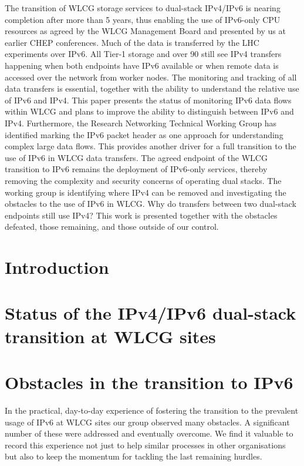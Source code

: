 \documentclass{webofc}
\begin{document}
\abstract
{The transition of WLCG storage services to dual-stack IPv4/IPv6 is nearing completion after more
than 5 years, thus enabling the use of IPv6-only CPU resources as agreed by the WLCG Management
Board and presented by us at earlier CHEP conferences. Much of the data is transferred by the LHC
experiments over IPv6. All Tier-1 storage and over 90%
still see IPv4 transfers happening when both endpoints have IPv6 available or when remote data is
accessed over the network from worker nodes.
The monitoring and tracking of all data transfers is essential, together with the ability to understand
the relative use of IPv6 and IPv4. This paper presents the status of monitoring IPv6 data flows within
WLCG and plans to improve the ability to distinguish between IPv6 and IPv4. Furthermore, the
Research Networking Technical Working Group has identified marking the IPv6 packet header as one
approach for understanding complex large data flows. This provides another driver for a full
transition to the use of IPv6 in WLCG data transfers.
The agreed endpoint of the WLCG transition to IPv6 remains the deployment of IPv6-only services,
thereby removing the complexity and security concerns of operating dual stacks. The working group
is identifying where IPv4 can be removed and investigating the obstacles to the use of IPv6 in WLCG.
Why do transfers between two dual-stack endpoints still use IPv4? This work is presented together
with the obstacles defeated, those remaining, and those outside of our control.}
\maketitle
\section{Introduction}
\label{sec-intro}

%
\section{Status of the IPv4/IPv6 dual-stack transition at WLCG sites}
\label{sec-dualstack}

%
\section{Obstacles in the transition to IPv6}
\label{sec-obstacles}
In the practical, day-to-day experience of fostering the transition to
the prevalent usage of IPv6 at WLCG sites our group observed many obstacles.
A significant number of these were addressed and eventually overcome. We
find it valuable to record this experience not just to help similar
processes in other organisations but also to keep the momentum for tackling
the last remaining hurdles.
%
\end{document}
